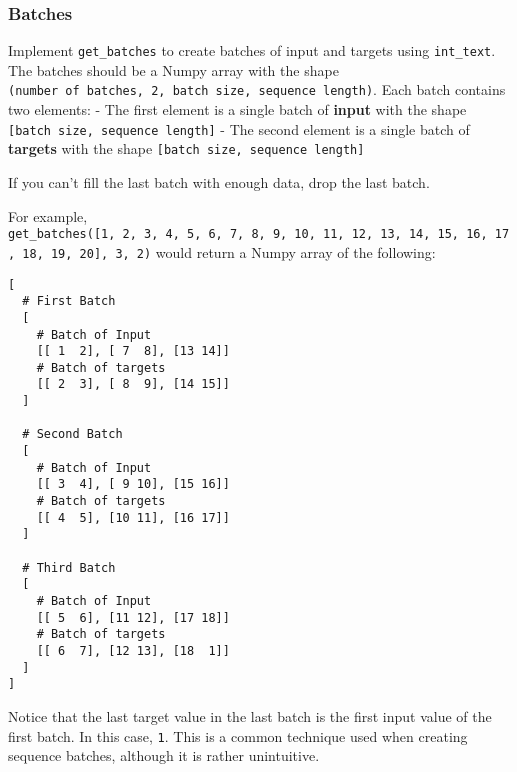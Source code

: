 \documentclass[11pt]{article}
\begin{document}
    \hypertarget{batches}{%
\subsubsection{Batches}\label{batches}}

Implement \texttt{get\_batches} to create batches of input and targets
using \texttt{int\_text}. The batches should be a Numpy array with the
shape
\texttt{(number\ of\ batches,\ 2,\ batch\ size,\ sequence\ length)}.
Each batch contains two elements: - The first element is a single batch
of \textbf{input} with the shape
\texttt{{[}batch\ size,\ sequence\ length{]}} - The second element is a
single batch of \textbf{targets} with the shape
\texttt{{[}batch\ size,\ sequence\ length{]}}

If you can't fill the last batch with enough data, drop the last batch.

For example,
\texttt{get\_batches({[}1,\ 2,\ 3,\ 4,\ 5,\ 6,\ 7,\ 8,\ 9,\ 10,\ 11,\ 12,\ 13,\ 14,\ 15,\ 16,\ 17,\ 18,\ 19,\ 20{]},\ 3,\ 2)}
would return a Numpy array of the following:

\begin{verbatim}
[
  # First Batch
  [
    # Batch of Input
    [[ 1  2], [ 7  8], [13 14]]
    # Batch of targets
    [[ 2  3], [ 8  9], [14 15]]
  ]

  # Second Batch
  [
    # Batch of Input
    [[ 3  4], [ 9 10], [15 16]]
    # Batch of targets
    [[ 4  5], [10 11], [16 17]]
  ]

  # Third Batch
  [
    # Batch of Input
    [[ 5  6], [11 12], [17 18]]
    # Batch of targets
    [[ 6  7], [12 13], [18  1]]
  ]
]
\end{verbatim}

Notice that the last target value in the last batch is the first input
value of the first batch. In this case, \texttt{1}. This is a common
technique used when creating sequence batches, although it is rather
unintuitive.
\end{document}
